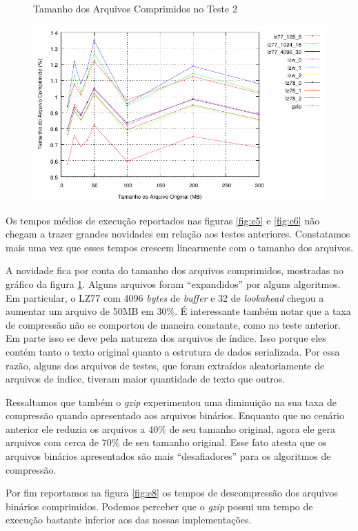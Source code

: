\documentclass[]{article}
\newcommand{\figref}[1]{figura \ref{#1}}
\begin{document}
\begin{figure}
	{\centering Tamanho dos Arquivos Comprimidos no Teste 2\par}
	\includegraphics{images/binario_taxa}
\caption{}
\label{fig:e7}
\end{figure}


Os tempos médios de execução reportados nas figuras \ref{fig:e5} e \ref{fig:e6} não chegam a trazer grandes novidades em relação aos testes anteriores. Constatamos mais uma vez que esses tempos crescem linearmente com o tamanho dos arquivos.

A novidade fica por conta do tamanho dos arquivos comprimidos, mostradas no gráfico da \figref{fig:e7}. Alguns arquivos foram ``expandidos'' por alguns algoritmos. Em particular, o LZ77 com 4096 \textit{bytes} de \textit{buffer} e 32 de \textit{lookahead} chegou a aumentar um arquivo de 50MB em 30\%. É interessante também notar que a taxa de compressão não se comportou de maneira constante, como no teste anterior. Em parte isso se deve pela natureza dos arquivos de índice. Isso porque eles contém tanto o texto original quanto a estrutura de dados serializada. Por essa razão, alguns dos arquivos de testes, que foram extraídos aleatoriamente de arquivos de índice, tiveram maior quantidade de texto que outros.

Ressaltamos que também o \textit{gzip} experimentou uma diminuição na sua taxa de compressão quando apresentado aos arquivos binários. Enquanto que no cenário anterior ele reduzia os arquivos a 40\% de seu tamanho original, agora ele gera arquivos com cerca de 70\% de seu tamanho original. Esse fato atesta que os arquivos binários apresentados são mais ``desafiadores'' para os algoritmos de compressão.

Por fim reportamos na \figref{fig:e8} os tempos de descompressão dos arquivos binários comprimidos. Podemos perceber que o \textit{gzip} possui um tempo de execução bastante inferior aos das nossas implementações. 
\end{document}
